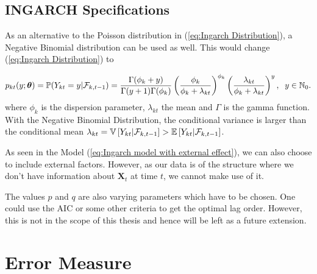 
\subsection{INGARCH Specifications}
\label{sec: Ingarch Specifications}

As an alternative to the Poisson distribution in (\ref{eq:Ingarch Distribution}), a Negative Binomial distribution can be used as well. This would change (\ref{eq:Ingarch Distribution}) to 

\begin{equation}
p_{kt}(y;\bm{\theta})=\mathbb{P}(Y_{kt}=y | \mathcal{F}_{k,t-1}) = \frac{\Gamma(\phi_k+y)}{\Gamma(y+1)\Gamma(\phi_k)}\left(\frac{\phi_k}{\phi_k+\lambda_{kt}}\right)^{\phi_k}\left(\frac{\lambda_{kt}}{\phi_k+\lambda_{kt}}\right)^y, \hspace{0.2cm} y \in \mathbb{N}_0.
\label{eq:Ingarch negbinom Distribution}
\end{equation}
%
where $\phi_k$ is the dispersion parameter, $\lambda_{kt}$ the mean and $\Gamma$ is the gamma function. 
With the Negative Binomial Distribution, the conditional variance is larger than the conditional mean $\lambda_{kt} = \mathbb{V}\left[Y_{kt} | \mathcal{F}_{k,t-1}\right] > \mathbb{E}\left[Y_{kt} | \mathcal{F}_{k,t-1}\right]$.

As seen in the Model (\ref{eq:Ingarch model with external effect}), we can also choose to include external factors. However, as our data is of the structure where we don't have information about $\bm{X}_t$ at time $t$, we cannot make use of it. 

The values $p$ and $q$ are also varying parameters which have to be chosen. One could use the AIC or some other criteria to get the optimal lag order. However, this is not in the scope of this thesis and hence will be left as a future extension.




\section{Error Measure}
\label{sec: Error Measure}

